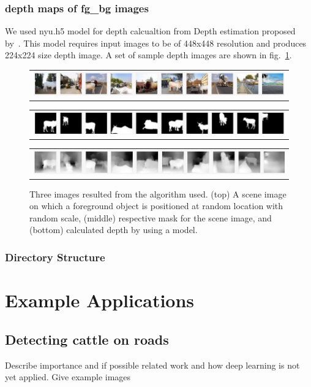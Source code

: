\documentclass[review]{cvpr}
\begin{document}
\subsubsection{depth maps of fg\_bg images}
We used nyu.h5 model for depth calcualtion from Depth estimation proposed by~\cite{alhashim2018high}. 
This model requires input images to be of 448x448 resolution and produces 224x224 size depth image. 
A set of sample depth images are shown in fig.~\ref{fig:finaldataset}.

\begin{figure}
  \begin{center}
  \begin{tabular}{@{}c@{}}
      \includegraphics[width=0.8\linewidth]{overlay.jpg}
  \end{tabular}
  \begin{tabular}{@{}c@{}}
      \includegraphics[width=0.8\linewidth]{overlaymask.jpg}
  \end{tabular}
  \begin{tabular}{@{}c@{}}
      \includegraphics[width=0.8\linewidth]{overlaydepth.jpg}
  \end{tabular}
  \end{center}
  \caption{Three images resulted from the algorithm used. (top) A scene image on which a foreground object is positioned
   at random location with random scale, (middle) respective mask for the scene image, and (bottom) calculated depth by using a model.}
  \label{fig:finaldataset}
\end{figure}

\subsubsection{Directory Structure}

\section{Example Applications}
\subsection{Detecting cattle on roads}
Describe importance and if possible related work and how deep learning is not yet applied.
Give example images
\end{document}

